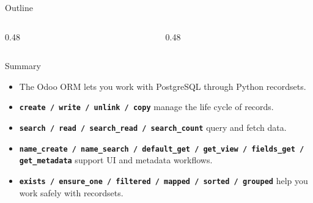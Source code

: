 \documentclass{bjt}
\title[\ShortTitle]{\Title}               %
\subtitle{\Subtitle}                      %
\author[\ShortAuthor]{\AuthorName}         %
\date{\PresentationDate}                  %
\begin{document}
\maketitleframe

\begin{frame}{Outline}
\begin{columns}[T]
\begin{column}{0.48\textwidth}
\tableofcontents[sections={1-11}]
\end{column}
\begin{column}{0.48\textwidth}
\tableofcontents[sections={12-21}]
\end{column}
\end{columns}
\end{frame}























\begin{frame}{Summary}
	\begin{itemize}
		\item The Odoo ORM lets you work with PostgreSQL through Python recordsets.
		\item \textbf{\texttt{create / write / unlink / copy}} manage the life cycle of records.
		\item \textbf{\texttt{search / read / search\_read / search\_count}} query and fetch data.
		\item \textbf{\texttt{name\_create / name\_search / default\_get / get\_view / fields\_get / get\_metadata}} support UI and metadata workflows.
		\item \textbf{\texttt{exists / ensure\_one / filtered / mapped / sorted / grouped}} help you work safely with recordsets.
	\end{itemize}
\end{frame}
\end{document}
